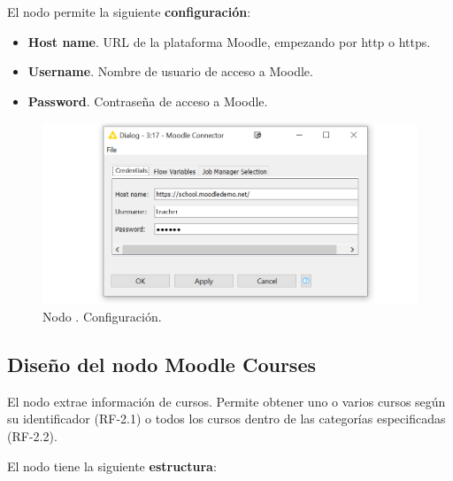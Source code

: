 El nodo permite la siguiente \textbf{configuración}: 

\begin{itemize}
   \item \textbf{Host name}. URL de la plataforma Moodle, empezando por http o https. 
   \item \textbf{Username}. Nombre de usuario de acceso a Moodle.
   \item \textbf{Password}. Contraseña de acceso a Moodle.
\end{itemize}

\begin{figure}[!h]
	\centering
	\includegraphics[width=1\textwidth]{img/nodes_moodle_connector_settings.png}
	\caption{Nodo . Configuración.}
	\label{fig:moodleconnector_settings}
\end{figure}
\FloatBarrier

\hphantom{ }

\newpage    
\subsection{Diseño del nodo Moodle Courses}

El nodo  extrae información de cursos. Permite obtener uno o varios cursos según su identificador (RF-2.1) o todos 
los cursos dentro de las categorías especificadas (RF-2.2). 
\

El nodo tiene la siguiente \textbf{estructura}:

